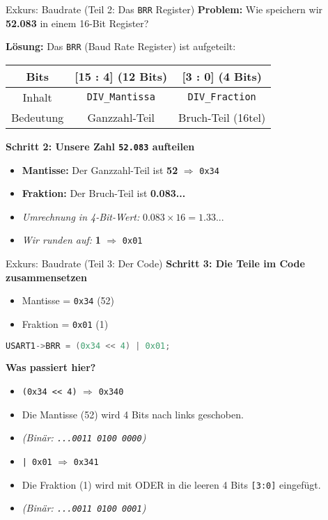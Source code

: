 \documentclass{beamer}
\begin{document}
\begin{frame}{Exkurs: Baudrate (Teil 2: Das \texttt{BRR} Register)}
	\textbf{Problem:} Wie speichern wir \textbf{52.083} in einem 16-Bit Register?
	
	\medskip
	\textbf{Lösung:} Das \texttt{BRR} (Baud Rate Register) ist aufgeteilt:
	
	\begin{center}
		\begin{tabular}{|c|c|c|}
			\hline
			Bits & \textbf{[15 : 4]} (12 Bits) & \textbf{[3 : 0]} (4 Bits) \\ \hline
			Inhalt & \texttt{DIV\_Mantissa} & \texttt{DIV\_Fraction} \\ 
			Bedeutung & Ganzzahl-Teil & Bruch-Teil (16tel) \\ \hline
		\end{tabular}
	\end{center}
	
	\medskip
	\textbf{Schritt 2: Unsere Zahl \texttt{52.083} aufteilen}
	\begin{itemize}
		\item \textbf{Mantisse:} Der Ganzzahl-Teil ist \textbf{52} $\Rightarrow$ \texttt{0x34}
		\item \textbf{Fraktion:} Der Bruch-Teil ist \textbf{0.083...}
		\item \textit{Umrechnung in 4-Bit-Wert:} $0.083 \times 16 = 1.33...$
		\item \textit{Wir runden auf:} \textbf{1} $\Rightarrow$ \texttt{0x01}
	\end{itemize}
\end{frame}

\begin{frame}[fragile]{Exkurs: Baudrate (Teil 3: Der Code)}
	\textbf{Schritt 3: Die Teile im Code zusammensetzen}
	\begin{itemize}
		\item Mantisse = \texttt{0x34} (52)
		\item Fraktion = \texttt{0x01} (1)
	\end{itemize}
	
	\bigskip
	\begin{lstlisting}[language=C, style=mystyle]
		USART1->BRR = (0x34 << 4) | 0x01;
	\end{lstlisting}
	
	\textbf{Was passiert hier?}
	\begin{itemize}
		\item \texttt{(0x34 << 4)} $\Rightarrow$ \texttt{0x340}
		\item Die Mantisse (52) wird 4 Bits nach links geschoben.
		\item \textit{(Binär: \texttt{...0011 0100 0000})}
		
		\medskip
		\item \texttt{| 0x01} $\Rightarrow$ \texttt{0x341}
		\item Die Fraktion (1) wird mit ODER in die leeren 4 Bits \texttt{[3:0]} eingefügt.
		\item \textit{(Binär: \texttt{...0011 0100 0001})}
	\end{itemize}
\end{frame}
\end{document}
